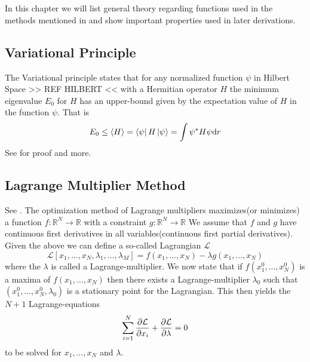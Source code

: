 \chapter{\label{chapter:2}}
    In this chapter we will list general theory regarding functions used in the
    methods mentioned in  and show important properties used
    in later derivations.

\section{Variational Principle\label{sec:varPrinc}}
    The Variational principle states that for any normalized function $\psi$ in
    Hilbert Space >> REF HILBERT << with a Hermitian operator $H$ the minimum
    eigenvalue $E_0$ for $H$ has an upper-bound given by the expectation value
    of $H$ in the function $\psi$. That is
        \begin{equation}
            E_0 \leq \left< {H} \right> = \bra{\psi}H\ket{\psi} = \int \psi^{*}H\psi \mathrm{d} r
        \end{equation}
    See \cite{GriffQuan} for proof and more.

\section{Lagrange Multiplier Method\label{sec:lagrange_multipliers}}
    See \cite{calcVar,calcVarSpring}. The optimization method of Lagrange
    multipliers maximizes(or minimizes) a function
    $f:\mathbb{R}^N\rightarrow\mathbb{R}$ with a constraint
    $g:\mathbb{R}^N\rightarrow\mathbb{R}$ We assume that $f$ and $g$ have
    continuous first derivatives in all variables(continuous first partial
    derivatives). \\
    Given the above we can define a so-called Lagrangian
    $\mathcal{L}$
        \begin{equation}
            \mathcal{L}[x_1,\dots,x_N,\lambda_1,\dots,\lambda_M] =
            f(x_1,\dots,x_N) - \lambda g(x_1,\dots,x_N)
            \label{eq:lagrangian}
        \end{equation}
    where the $\lambda$ is called a Lagrange-multiplier. We now state that if
    $f(x^0_1,\dots,x^0_N)$ is a maxima of $f(x_1,\dots,x_N)$ then there exists
    a Lagrange-multiplier $\lambda_0$ such that
    $(x^0_1,\dots,x^0_N,\lambda_0)$ is a stationary point
    for the Lagrangian. This then yields the $N+1$ Lagrange-equations
        \begin{align}
            \sum^N_{i=1} \frac{\mathrm{\partial}\mathcal{L}}{\mathrm{\partial} x_i} +
            \frac{\mathrm{\partial}\mathcal{L}}{\mathrm{\partial} \lambda} = 0
            \label{eq:lagrangeEQ}
        \end{align}
    to be solved for $x_1,\dots,x_N$ and $\lambda$.

